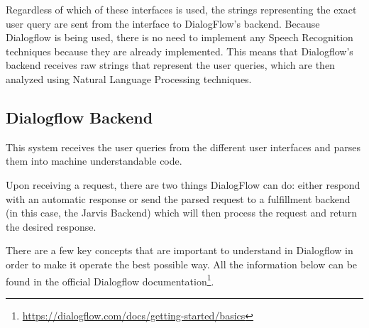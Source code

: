\documentclass[runningheads]{llncs}
\begin{document}
Regardless of which of these interfaces is used, the strings representing the exact user query are sent from the interface to DialogFlow’s backend. Because Dialogflow is being used, there is no need to implement any Speech Recognition techniques because they are already implemented. This means that Dialogflow's backend receives raw strings that represent the user queries, which are then analyzed using Natural Language Processing techniques.

\subsection{Dialogflow Backend}

This system receives the user queries from the different user interfaces and parses them into machine understandable code.

Upon receiving a request, there are two things DialogFlow can do: either respond with an automatic response or send the parsed request to a fulfillment backend (in this case, the Jarvis Backend) which will then process the request and return the desired response.

There are a few key concepts that are important to understand in Dialogflow in order to make it operate the best possible way. All the information below can be found in the official Dialogflow documentation\footnote{\url{https://dialogflow.com/docs/getting-started/basics}}.
\end{document}
